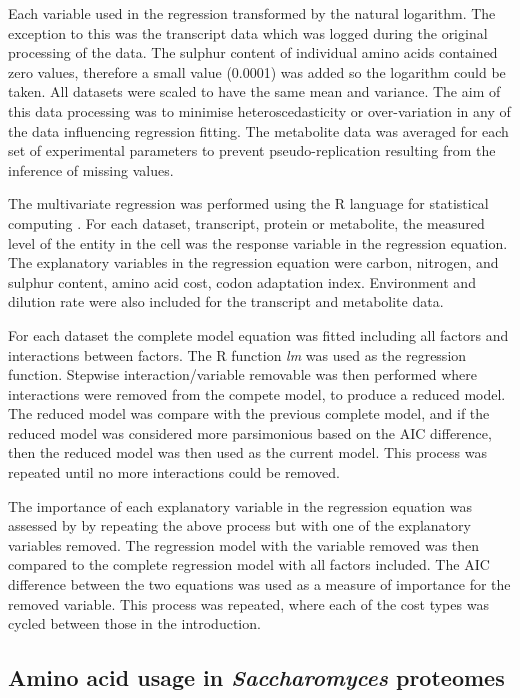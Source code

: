 Each variable used in the regression transformed by the natural logarithm. The exception to this was the transcript data which was logged during the original processing of the data. The sulphur content of individual amino acids contained zero values, therefore a small value (0.0001) was added so the logarithm could be taken. All datasets were scaled to have the same mean and variance. The aim of this data processing was to minimise heteroscedasticity or over-variation in any of the data influencing regression fitting. The metabolite data was averaged for each set of experimental parameters to prevent pseudo-replication resulting from the inference of missing values.

The multivariate regression was performed using the R language for statistical computing \cite{R}. For each dataset, transcript, protein or metabolite, the measured level of the entity in the cell was the response variable in the regression equation. The explanatory variables in the regression equation were carbon, nitrogen, and sulphur content, amino acid cost, codon adaptation index. Environment and dilution rate were also included for the transcript and metabolite data.

For each dataset the complete model equation was fitted including all factors and interactions between factors. The R function \emph{lm} was used as the regression function. Stepwise interaction/variable removable was then performed where interactions were removed from the compete model, to produce a reduced model. The reduced model was compare with the previous complete model, and if the reduced model was considered more parsimonious based on the AIC difference, then the reduced model was then used as the current model. This process was repeated until no more interactions could be removed.

The importance of each explanatory variable in the regression equation was assessed by by repeating the above process but with one of the explanatory variables removed. The regression model with the variable removed was then compared to the complete regression model with all factors included. The AIC difference between the two equations was used as a measure of importance for the removed variable. This process was repeated, where each of the cost types was cycled between those in the introduction.

\subsection{Amino acid usage in \emph{Saccharomyces} proteomes}

